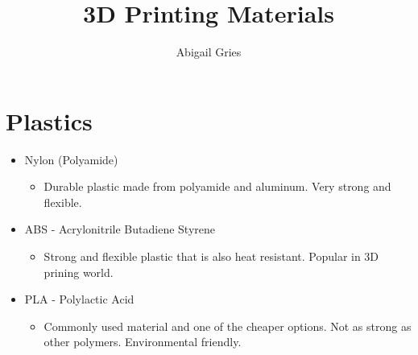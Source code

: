 \documentclass{article}
\begin{document}
\title{3D Printing Materials}

\author{Abigail Gries}

\maketitle

\section{Plastics}

\begin{itemize}

\item Nylon  (Polyamide)

\begin{itemize}

\item Durable plastic made from polyamide and aluminum. Very strong and flexible. 

\end{itemize}

\end{itemize}



\begin{itemize}

\item ABS - Acrylonitrile Butadiene Styrene 

\begin{itemize}

\item Strong and flexible plastic that is also heat resistant. Popular in 3D prining world.

\end{itemize}

\end{itemize}



\begin{itemize}

\item PLA - Polylactic Acid

\begin{itemize}

\item Commonly used material and one of the cheaper options. Not as strong as other polymers. Environmental friendly. 

\end{itemize}

\end{itemize}
\end{document}
